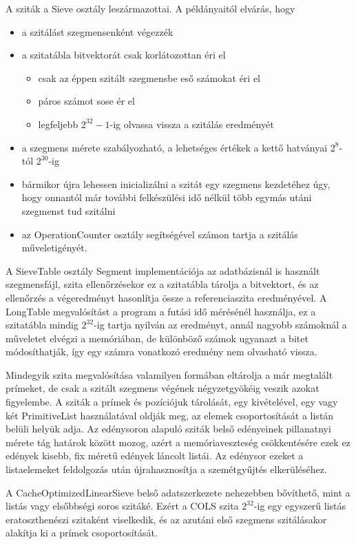 A sziták a Sieve osztály leszármazottai.
A példányaitól elvárás, hogy
\begin{itemize}
\item a szitálást szegmensenként végezzék
\item a szitatábla bitvektorát csak korlátozottan éri el
\begin{itemize}
\item csak az éppen szitált szegmensbe eső számokat éri el
\item páros számot sose ér el
\item legfeljebb $2^{32}-1$-ig olvassa vissza a szitálás eredményét
\end{itemize}
\item a szegmens mérete szabályozható, a lehetséges értékek a kettő hatványai $2^8$-tól $2^{30}$-ig 
\item bármikor újra lehessen inicializálni a szitát egy szegmens kezdetéhez úgy, hogy onnantól már további felkészülési idő nélkül több egymás utáni szegmenst tud szitálni
\item az OperationCounter osztály segítségével számon tartja a szitálás műveletigényét.
\end{itemize}

A SieveTable osztály Segment implementációja az adatbázisnál is használt szegmensfájl, szita ellenőrzésekor ez a szitatábla tárolja a bitvektort, és az ellenőrzés a végeredményt hasonlítja össze a referenciaszita eredményével.
A LongTable megvalósítást a program a futási idő mérésénél használja, ez a szitatábla mindig $2^{32}$-ig tartja nyilván az eredményt, annál nagyobb számoknál a műveletet elvégzi a memóriában, de különböző számok ugyanazt a bitet módosíthatják, így egy számra vonatkozó eredmény nem olvasható vissza.

Mindegyik szita megvalósítása valamilyen formában eltárolja a már megtalált prímeket, de csak a szitált szegmens végének négyzetgyökéig veszik azokat figyelembe.
A sziták a prímek és pozíciójuk tárolását, egy kivételével, egy vagy két PrimitiveList használatával oldják meg, az elemek csoportosítását a listán belüli helyük adja.
Az edénysoron alapuló sziták belső edényeinek pillanatnyi mérete tág határok között mozog, azért a memóriaveszteség csökkentésére ezek ez edények kisebb, fix méretű edények láncolt listái.
Az edénysor ezeket a listaelemeket feldolgozás után újrahasznosítja a szemétgyűjtés elkerüléséhez.

A CacheOptimizedLinearSieve belső adatszerkezete nehezebben bővíthető, mint a listás vagy elsőbbségi soros szitáké.
Ezért a COLS szita $2^{32}$-ig egy egyszerű listás eratoszthenészi szitaként viselkedik, és az azutáni első szegmens szitálásakor alakítja ki a prímek csoportosítását.


